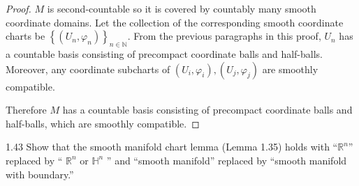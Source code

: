 \begin{proof}
    \( M \) is second-countable so it is covered by countably many smooth coordinate domains. Let the collection of the corresponding smooth coordinate charts be \( {\left\{ (U_{n}, \varphi_{n}) \right\}}_{n \in \mathbb{N}} \). From the previous paragraphs in this proof, \( U_{n} \) has a countable basis consisting of precompact coordinate balls and half-balls. Moreover, any coordinate subcharts of \( (U_{i}, \varphi_{i}), (U_{j}, \varphi_{j}) \) are smoothly compatible.

    Therefore \( M \) has a countable basis consisting of precompact coordinate balls and half-balls, which are smoothly compatible.
\end{proof}

\begin{exercise}{1.43}
    Show that the smooth manifold chart lemma (Lemma 1.35) holds with ``\( \mathbb{R}^{n} \)'' replaced by `` \( \mathbb{R}^{n} \) or \( \mathbb{H}^{n} \) '' and ``smooth manifold'' replaced by ``smooth manifold with boundary.\@''
\end{exercise}

